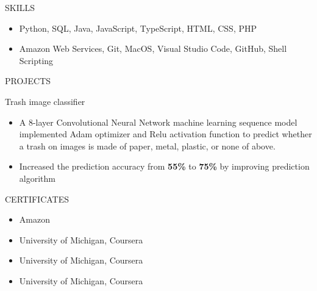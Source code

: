 \documentclass[]{resume}
\begin{document}
	\begin{cvsection}{SKILLS}
		\begin{cvsubsection}{}{}{}	
			\begin{itemize}
				\item Python, SQL, Java, JavaScript, TypeScript, HTML, CSS, PHP
				\item Amazon Web Services, Git, MacOS, Visual Studio Code, GitHub, Shell Scripting
			\end{itemize}
		\end{cvsubsection}
	\end{cvsection}
	
	\begin{cvsection}{PROJECTS}
		\begin{cvsubsection}{Trash image classifier}{}{}
			\begin{itemize}
			    \item A 8-layer Convolutional Neural Network machine learning sequence model implemented Adam optimizer and Relu activation function to predict whether a trash on images is made of paper, metal, plastic, or none of above. 
			    \item Increased the prediction accuracy from \textbf{55\%} to \textbf{75\%} by improving prediction algorithm
			\end{itemize}
		\end{cvsubsection}
	\end{cvsection}
	
	\begin{cvsection}{CERTIFICATES}
		\begin{cvsubsection}{}{}{}
		    \begin{itemize}
            \item \noindent {} \hfill {Amazon} \hfill {}
            \newline \noindent {} \hfill {} \hfill \llap{}
		        \item \noindent {} \hfill {University of Michigan, Coursera}\hfill {}
		        \item \noindent {} \hfill {University of Michigan, Coursera}\hfill {}
		        \item \noindent {} \hfill {University of Michigan, Coursera}\hfill {}
		    \end{itemize}
		\end{cvsubsection}
	\end{cvsection}
\end{document}
